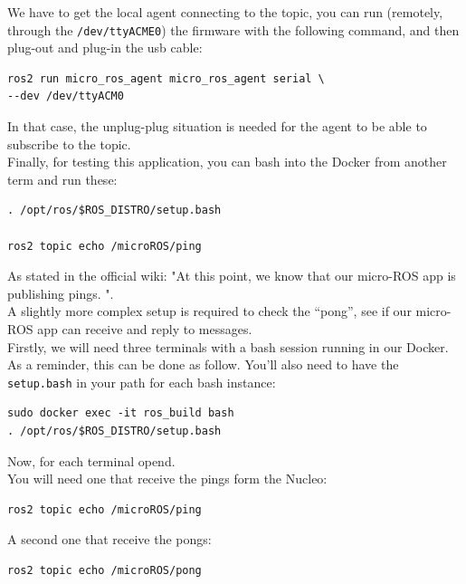 \documentclass[10pt]{article}
\begin{document}
We have to get the local agent connecting to the topic, you can run (remotely, through the \verb|/dev/ttyACME0|) the firmware with the following command, and then plug-out and plug-in the usb cable:
\begin{tcolorbox}
\begin{verbatim}
ros2 run micro_ros_agent micro_ros_agent serial \
--dev /dev/ttyACM0
\end{verbatim}
\end{tcolorbox}
In that case, the unplug-plug situation is needed for the agent to be able to subscribe to the topic.\\

Finally, for testing this application, you can bash into the Docker from another term and run these:
\begin{tcolorbox}
\begin{verbatim}
. /opt/ros/$ROS_DISTRO/setup.bash

ros2 topic echo /microROS/ping
\end{verbatim}
\end{tcolorbox}
As stated in the official wiki: "At this point, we know that our micro-ROS app is publishing pings. ".\\

A slightly more complex setup is required to check the ``pong'', see if our micro-ROS app can receive and reply to messages.\\
Firstly, we will need three terminals with a bash session running in our Docker. As a reminder, this can be done as follow. You'll also need to have the \verb|setup.bash| in your path for each bash instance:
\begin{tcolorbox}
\begin{verbatim}
sudo docker exec -it ros_build bash
. /opt/ros/$ROS_DISTRO/setup.bash
\end{verbatim}
\end{tcolorbox}

Now, for each terminal opend.\\
You will need one that receive the pings form the Nucleo:
\begin{tcolorbox}
\begin{verbatim}
ros2 topic echo /microROS/ping
\end{verbatim}
\end{tcolorbox}

A second one that receive the pongs:
\begin{tcolorbox}
\begin{verbatim}
ros2 topic echo /microROS/pong
\end{verbatim}
\end{tcolorbox}
\end{document}
